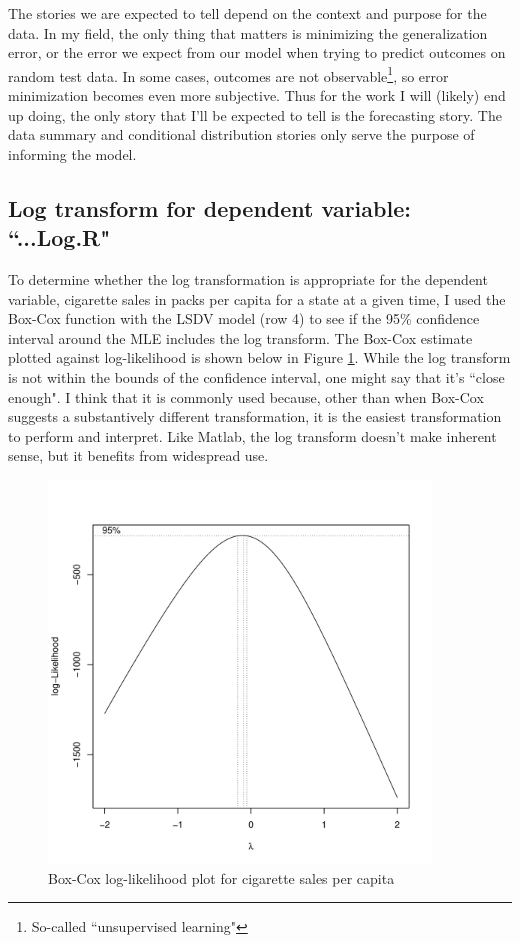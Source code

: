 \documentclass{article}
\begin{document}
The stories we are expected to tell depend on the context and purpose for the data.  In my field, the only thing that matters is minimizing the generalization error, or the error we expect from our model when trying to predict outcomes on random test data. In some cases, outcomes are not observable\footnote{So-called ``unsupervised learning"}, so error minimization becomes even more subjective. Thus for the work I will (likely) end up doing, the only story that I'll be expected to tell is the forecasting story. The data summary and conditional distribution stories only serve the purpose of informing the model.

\subsection{Log transform for dependent variable: ``...Log.R"}
To determine whether the log transformation is appropriate for the dependent variable, cigarette sales in packs per capita for a state at a given time, I used the Box-Cox function with the LSDV model (row 4) to see if the 95\% confidence interval around the MLE includes the log transform. The Box-Cox estimate plotted against log-likelihood is shown below in Figure \ref{boxcar}. While the log transform is not within the bounds of the confidence interval, one might say that it's ``close enough". I think that it is commonly used because, other than when Box-Cox suggests a substantively different transformation, it is the easiest transformation to perform and interpret. Like Matlab, the log transform doesn't make inherent sense, but it benefits from widespread use.

\begin{figure}[H]
\centering
\includegraphics[width = 4in]{figures/BoxCox.pdf}
\caption{Box-Cox log-likelihood plot for cigarette sales per capita}
\label{boxcar}
\end{figure}
\end{document}
